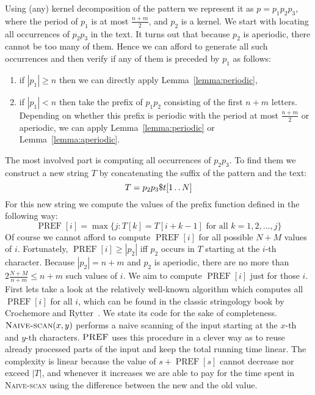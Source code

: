 \documentclass[runningheads]{llncs}
\newcommand{\twodots}{\mathinner{\ldotp\ldotp}}
\newcommand{\proc}[1]{\textnormal{\scshape#1}}
\DeclareMathOperator{\PREF}{PREF}
\begin{document}
Using (any) kernel decomposition of the pattern we represent it as $p=p_1 p_2 p_3$, where the period of $p_1$ is at most $\frac{n+m}{2}$, and
$p_2$ is a kernel. We start with locating all occurrences of $p_2 p_3$ in the text. It turns out that because $p_2$ is aperiodic, there cannot
be too many of them. Hence we can afford to generate all such occurrences and then verify if any of them is preceded by $p_1$ as follows:

\begin{enumerate}
\item if $|p_1|\geq n$ then we can directly apply Lemma~\ref{lemma:periodic},
\item if $|p_1|<n$ then take the prefix of $p_1 p_2$ consisting of the first $n+m$ letters. Depending on whether this prefix is periodic with the period at most $\frac{n+m}{2}$ or aperiodic, we can apply Lemma~\ref{lemma:periodic} or Lemma~\ref{lemma:aperiodic}.
\end{enumerate}

The most involved part is computing all occurrences of $p_2 p_3$. To find them we construct a new string $T$ by concatenating the suffix of the pattern and the text:
$$T=p_2 p_3 \$t[1\twodots N]$$
For this new string we compute the values of the prefix function defined in the following way:
$$
\PREF[i] = \max\{j : T[k]=T[i+k-1] \text{ for all } k=1,2,\ldots,j \}
$$
Of course we cannot afford to compute $\PREF[i]$ for all possible $N+M$ values of $i$. Fortunately, $\PREF[i]\geq |p_2|$ iff $p_2$ occurs in $T$ 
starting at the $i$-th character. Because $|p_2|=n+m$ and $p_2$ is aperiodic, there are no more than $2\frac{N+M}{n+m}\leq n+m$ such values of $i$. We aim
to compute $\PREF[i]$ just for those $i$. First lets take a look at the relatively well-known algorithm which computes all $\PREF[i]$ for
all $i$, which can be found in the classic stringology book by Crochemore and Rytter~\cite{Jewels}. We state its code for the sake of completeness. 
$\proc{Naive-scan}(x,y)$ performs a naive scanning
of the input starting at the $x$-th and $y$-th characters. $\proc{PREF}$ uses this procedure in a clever way as to reuse already processed
parts of the input and keep the total running time linear. The complexity is linear because the value of $s+\PREF[s]$ cannot decrease nor
exceed $|T|$, and whenever it increases we are able to pay for the time spent in \proc{Naive-scan} using the difference between the new and the old
value.
\end{document}
